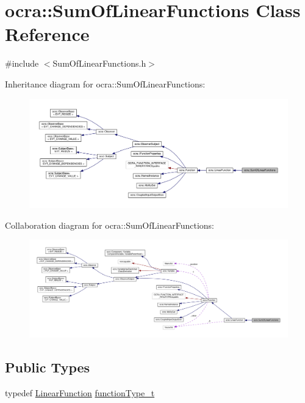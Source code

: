 \hypertarget{classocra_1_1SumOfLinearFunctions}{}\section{ocra\+:\+:Sum\+Of\+Linear\+Functions Class Reference}
\label{classocra_1_1SumOfLinearFunctions}


{\ttfamily \#include $<$Sum\+Of\+Linear\+Functions.\+h$>$}



Inheritance diagram for ocra\+:\+:Sum\+Of\+Linear\+Functions\+:
\nopagebreak
\begin{figure}[H]
\begin{center}
\leavevmode
\includegraphics[width=350pt]{d0/d7c/classocra_1_1SumOfLinearFunctions__inherit__graph}
\end{center}
\end{figure}


Collaboration diagram for ocra\+:\+:Sum\+Of\+Linear\+Functions\+:
\nopagebreak
\begin{figure}[H]
\begin{center}
\leavevmode
\includegraphics[width=350pt]{d9/d3f/classocra_1_1SumOfLinearFunctions__coll__graph}
\end{center}
\end{figure}
\subsection*{Public Types}
\begin{DoxyCompactItemize}
\item 
typedef \hyperlink{classocra_1_1LinearFunction}{Linear\+Function} \hyperlink{classocra_1_1SumOfLinearFunctions_ae7f2c949cbda9d69d13e64e5bfeb5fa9}{function\+Type\+\_\+t}
\end{DoxyCompactItemize}
